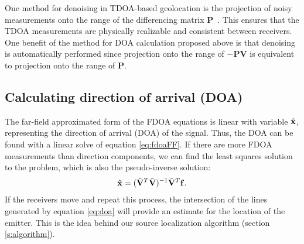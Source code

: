 One method for denoising in TDOA-based geolocation is the projection of noisy measurements onto the range of the differencing matrix $\mathbf{P}$~\cite{Schmidt1996,Compagnoni2017}. This ensures that the TDOA measurements are physically realizable and consistent between receivers. One benefit of the method for DOA calculation proposed above is that denoising is automatically performed since projection onto the range of $\mathbf{-PV}$ is equivalent to projection onto the range of $\mathbf{P}$.

\subsection{Calculating direction of arrival (DOA)}
The far-field approximated form of the FDOA equations is linear with variable $\hat{\mathbf{x}}$, representing the direction of arrival (DOA) of the signal. Thus, the DOA can be found with a linear solve of equation \ref{eq:fdoaFF}. If there are more FDOA measurements than direction components, we can find the least squares solution to the problem, which is also the pseudo-inverse solution:
\begin{align}
  \label{eq:doa}
\hat{\mathbf{x}} = (\tilde{\mathbf{V}}^T\tilde{\mathbf{V}})^{-1}\tilde{\mathbf{V}}^T\mathbf{f}.
\end{align}
If the receivers move and repeat this process, the intersection of the lines generated by equation \ref{eq:doa} will provide an estimate for the location of the emitter. This is the idea behind our source localization algorithm (section \ref{s:algorithm}).
